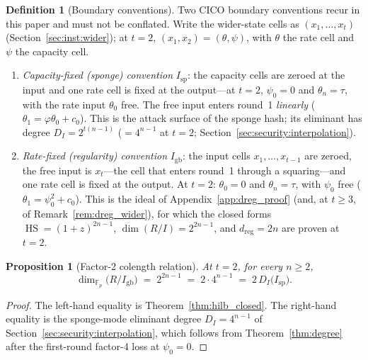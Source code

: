 \documentclass[11pt,a4paper]{article}
\newtheorem{proposition}[theorem]{Proposition}
\theoremstyle{definition}
\newtheorem{definition}[theorem]{Definition}
\newcommand{\F}{\mathbb{F}}
\begin{document}
\begin{definition}[Boundary conventions]\label{def:boundary_conventions}
Two CICO boundary conventions recur in this paper and must not be
conflated. Write the wider-state cells as $(x_1, \ldots, x_t)$
(Section~\ref{sec:inst:wider}); at $t = 2$, $(x_1, x_2) =
(\theta, \psi)$, with $\theta$ the rate cell and $\psi$ the capacity
cell.
\begin{enumerate}[nosep]
  \item[(i)] \emph{Capacity-fixed (sponge) convention} $I_{\mathrm{sp}}$:
    the capacity cells are zeroed at the input and one rate cell is
    fixed at the output---at $t = 2$, $\psi_0 = 0$ and
    $\theta_n = \tau$, with the rate input $\theta_0$ free. The free
    input enters round~1 \emph{linearly}
    ($\theta_1 = \varphi\theta_0 + c_0$). This is the attack surface
    of the sponge hash; its eliminant has degree
    $D_I = 2^{t(n-1)}$ ($= 4^{n-1}$ at $t=2$;
    Section~\ref{sec:security:interpolation}).
  \item[(ii)] \emph{Rate-fixed (regularity) convention}
    $I_{\mathrm{gb}}$: the input cells $x_1, \ldots, x_{t-1}$ are
    zeroed, the free input is $x_t$---the cell that enters round~1
    through a squaring---and one rate cell is fixed at the
    output. At $t = 2$: $\theta_0 = 0$ and $\theta_n = \tau$, with
    $\psi_0$ free ($\theta_1 = \psi_0^2 + c_0$). This is the ideal of
    Appendix~\ref{app:dreg_proof} (and, at $t \ge 3$, of
    Remark~\ref{rem:dreg_wider}), for which the closed forms
    $\operatorname{HS} = (1+z)^{2n-1}$,
    $\dim(R/I) = 2^{2n-1}$, and $d_{\mathrm{reg}} = 2n$ are proven at
    $t = 2$.
\end{enumerate}
\end{definition}

\begin{proposition}[Factor-2 colength relation]\label{prop:factor2}
At $t = 2$, for every $n \ge 2$,
\[
  \dim_{\F_p}\!\bigl(R/I_{\mathrm{gb}}\bigr)
  \;=\; 2^{2n-1}
  \;=\; 2 \cdot 4^{n-1}
  \;=\; 2\,D_I\bigl(I_{\mathrm{sp}}\bigr).
\]
\end{proposition}

\begin{proof}
The left-hand equality is Theorem~\ref{thm:hilb_closed}. The
right-hand equality is the sponge-mode eliminant degree
$D_I = 4^{n-1}$ of Section~\ref{sec:security:interpolation}, which
follows from Theorem~\ref{thm:degree} after the first-round factor-4
loss at $\psi_0 = 0$.
\end{proof}
\end{document}

